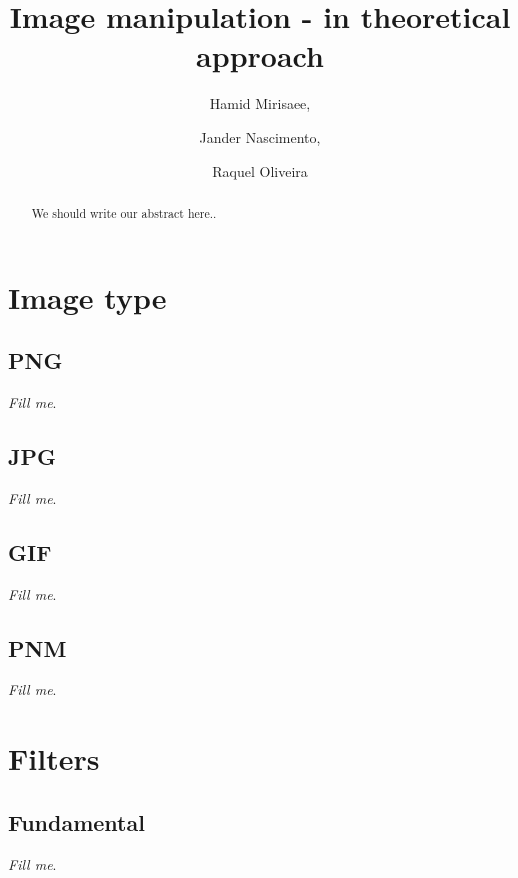 \documentclass{report}
\begin{document}
\title{Image manipulation - in theoretical approach}

\author{Hamid Mirisaee,
\and Jander Nascimento, 
\and Raquel Oliveira}

\maketitle

\begin{abstract}

We should write our abstract here..

\end{abstract}

\tableofcontents

\vfill

\section{Image type}

	\subsection{PNG}

		\textit{Fill me}.

	\subsection{JPG}

		\textit{Fill me}.

	\subsection{GIF}

		\textit{Fill me}.

	\subsection{PNM}

		\textit{Fill me}.

\section{Filters}

	\subsection{Fundamental}

		\textit{Fill me}.
\end{document}
